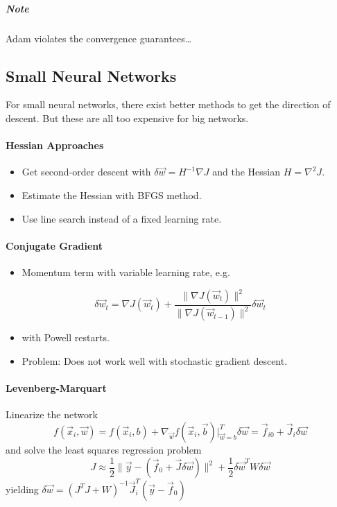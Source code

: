 				\subparagraph{Note}
					Adam violates the convergence guarantees\dots

		\subsection{Small Neural Networks}
			For small neural networks, there exist better methods to get the direction of descent. But these are all too expensive for big networks.

			\paragraph{Hessian Approaches}
				\begin{itemize}
					\item Get second-order descent with \( \delta\vec{w} = H^{-1} \nabla J \) and the Hessian \( H = \nabla^2 J \).
					\item Estimate the Hessian with BFGS method.
					\item Use line search instead of a fixed learning rate.
				\end{itemize}

			\paragraph{Conjugate Gradient}
				\begin{itemize}
					\item Momentum term with variable learning rate, e.g.
				\end{itemize}
				\begin{equation}
					\delta\vec{w}_t = \nabla J(\vec{w}_t) + \frac{\lVert \nabla J(\vec{w}_t) \rVert ^2}{\lVert \nabla J(\vec{w}_{t - 1}) \rVert^2} \delta\vec{w}_{t}
				\end{equation}
				\begin{itemize}
					\item[] with Powell restarts.
					\item Problem: Does not work well with stochastic gradient descent.
				\end{itemize}

			\paragraph{Levenberg-Marquart}
				Linearize the network
				\begin{equation}
					f(\vec{x}_i, \vec{w}) = f(\vec{x}_i, b) + \nabla_{\vec{w}} f(\vec{x}_i, \vec{b}) \big\vert_{\vec{w} = b}^T \delta\vec{w} = \vec{f}_{i0} + \vec{J}_i \delta\vec{w}
				\end{equation}
				and solve the least squares regression problem
				\begin{equation}
					J \approx \frac{1}{2} \lVert \vec{y} - (\vec{f}_0 + \vec{J} \delta\vec{w}) \rVert^2 + \frac{1}{2} \delta\vec{w}^T W \delta\vec{w}
				\end{equation}
				yielding \( \delta\vec{w} = (J^T J + W)^{-1} \vec{J}_i^T (\vec{y} - \vec{f}_0) \)


